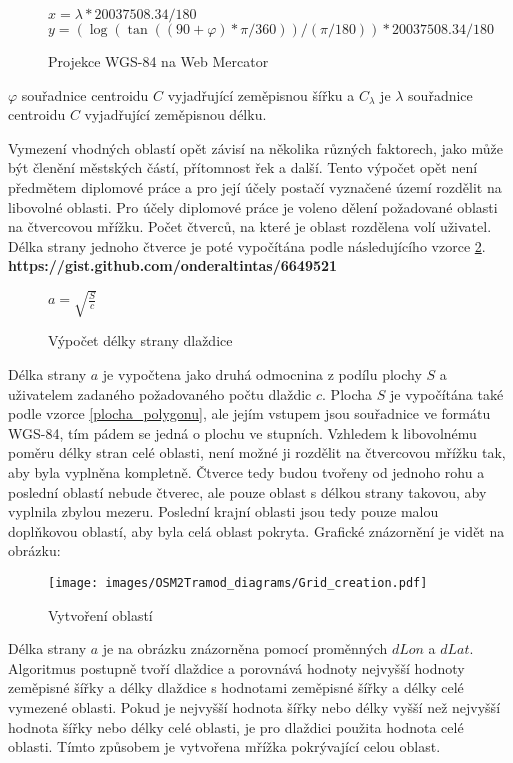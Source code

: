 \begin{figure}[htbp]
  \centering
  $\displaystyle x = \lambda * 20037508.34 / 180$
  $\displaystyle y = (\log(\tan((90 + \varphi) * \pi / 360)) / (\pi / 180)) * 20037508.34 / 180 $
  \caption{Projekce WGS-84 na Web Mercator}
  \label{degrees_to_meters}
\end{figure}

$\varphi$ souřadnice centroidu $C$ vyjadřující zeměpisnou šířku a $C_\lambda$ je $\lambda$ souřadnice centroidu $C$ vyjadřující zeměpisnou délku.

Vymezení vhodných oblastí opět závisí na několika různých faktorech, jako může být členění městských částí, přítomnost řek a další. Tento výpočet opět není předmětem diplomové práce a pro její účely postačí vyznačené území rozdělit na libovolné oblasti. Pro účely diplomové práce je voleno dělení požadované oblasti na čtvercovou mřížku. Počet čtverců, na které je oblast rozdělena volí uživatel. Délka strany jednoho čtverce je poté vypočítána podle následujícího vzorce \ref{delka_strany_dlazdice}. \textbf{https://gist.github.com/onderaltintas/6649521}

\begin{figure}[htbp]
  \centering
  $\displaystyle a = \sqrt{\frac{S}{c}}$
  \caption{Výpočet délky strany dlaždice}
  \label{delka_strany_dlazdice}
\end{figure}

Délka strany $a$ je vypočtena jako druhá odmocnina z podílu plochy $S$ a uživatelem zadaného požadovaného počtu dlaždic $c$. Plocha $S$ je vypočítána také podle vzorce \ref{plocha_polygonu}, ale jejím vstupem jsou souřadnice ve formátu WGS-84, tím pádem se jedná o plochu ve stupních. Vzhledem k libovolnému poměru délky stran celé oblasti, není možné ji rozdělit na čtvercovou mřížku tak, aby byla vyplněna kompletně. Čtverce tedy budou tvořeny od jednoho rohu a poslední oblastí nebude čtverec, ale pouze oblast s délkou strany takovou, aby vyplnila zbylou mezeru. Poslední krajní oblasti jsou tedy pouze malou doplňkovou oblastí, aby byla celá oblast pokryta. Grafické znázornění je vidět na obrázku: 

\begin{figure}[htbp]
\centering
\texttt{[image: images/OSM2Tramod\_diagrams/Grid\_creation.pdf]}
\caption{Vytvoření oblastí}
\end{figure}
\vspace{10pt}

Délka strany $a$ je na obrázku znázorněna pomocí proměnných $dLon$ a $dLat$. Algoritmus postupně tvoří dlaždice a porovnává hodnoty nejvyšší hodnoty zeměpisné šířky a délky dlaždice s hodnotami zeměpisné šířky a délky celé vymezené oblasti. Pokud je nejvyšší hodnota šířky nebo délky vyšší než nejvyšší hodnota šířky nebo délky celé oblasti, je pro dlaždici použita hodnota celé oblasti. Tímto způsobem je vytvořena mřížka pokrývající celou oblast.  

